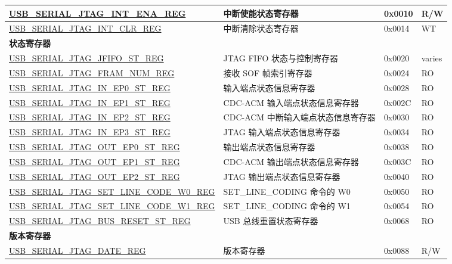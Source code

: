 \begin{longtable}{ | p{7.4cm} | p{5.2cm} | p{1.2cm} | p{1.7cm} | }
\hyperref[regdesc:USBSERIALJTAGINTENAREG]{USB\_SERIAL\_JTAG\_INT\_ENA\_REG} & 中断使能状态寄存器 & 0x0010 & R/W \\ \hline
\hyperref[regdesc:USBSERIALJTAGINTCLRREG]{USB\_SERIAL\_JTAG\_INT\_CLR\_REG} & 中断清除状态寄存器 & 0x0014 & WT \\ \hline
\multicolumn{4}{|l|}{\textbf{状态寄存器}} \\ \hline
\hyperref[regdesc:USBSERIALJTAGJFIFOSTREG]{USB\_SERIAL\_JTAG\_JFIFO\_ST\_REG} & JTAG FIFO 状态与控制寄存器 & 0x0020 & varies \\ \hline
\hyperref[regdesc:USBSERIALJTAGFRAMNUMREG]{USB\_SERIAL\_JTAG\_FRAM\_NUM\_REG} & 接收 SOF 帧索引寄存器 & 0x0024 & RO \\ \hline
\hyperref[regdesc:USBSERIALJTAGINEP0STREG]{USB\_SERIAL\_JTAG\_IN\_EP0\_ST\_REG} & 输入端点状态信息寄存器 & 0x0028 & RO \\ \hline
\hyperref[regdesc:USBSERIALJTAGINEP1STREG]{USB\_SERIAL\_JTAG\_IN\_EP1\_ST\_REG} & CDC-ACM 输入端点状态信息寄存器 & 0x002C & RO \\ \hline
\hyperref[regdesc:USBSERIALJTAGINEP2STREG]{USB\_SERIAL\_JTAG\_IN\_EP2\_ST\_REG} & CDC-ACM 中断输入端点状态信息寄存器 & 0x0030 & RO \\ \hline
\hyperref[regdesc:USBSERIALJTAGINEP3STREG]{USB\_SERIAL\_JTAG\_IN\_EP3\_ST\_REG} & JTAG 输入端点状态信息寄存器 & 0x0034 & RO \\ \hline
\hyperref[regdesc:USBSERIALJTAGOUTEP0STREG]{USB\_SERIAL\_JTAG\_OUT\_EP0\_ST\_REG} & 输出端点状态信息寄存器 & 0x0038 & RO \\ \hline
\hyperref[regdesc:USBSERIALJTAGOUTEP1STREG]{USB\_SERIAL\_JTAG\_OUT\_EP1\_ST\_REG} & CDC-ACM 输出端点状态信息寄存器 & 0x003C & RO \\ \hline
\hyperref[regdesc:USBSERIALJTAGOUTEP2STREG]{USB\_SERIAL\_JTAG\_OUT\_EP2\_ST\_REG} & JTAG 输出端点状态信息寄存器 & 0x0040 & RO \\ \hline
\hyperref[regdesc:USBSERIALJTAGSETLINECODEW0REG]{USB\_SERIAL\_JTAG\_SET\_LINE\_CODE\_W0\_REG} & SET\_LINE\_CODING 命令的 W0 & 0x0050 & RO \\ \hline
\hyperref[regdesc:USBSERIALJTAGSETLINECODEW1REG]{USB\_SERIAL\_JTAG\_SET\_LINE\_CODE\_W1\_REG} & SET\_LINE\_CODING 命令的 W1 & 0x0054 & RO \\ \hline
\hyperref[regdesc:USBSERIALJTAGBUSRESETSTREG]{USB\_SERIAL\_JTAG\_BUS\_RESET\_ST\_REG} & USB 总线重置状态寄存器 & 0x0068 & RO \\ \hline
\multicolumn{4}{|l|}{\textbf{版本寄存器}} \\ \hline
\hyperref[regdesc:USBSERIALJTAGDATEREG]{USB\_SERIAL\_JTAG\_DATE\_REG} & 版本寄存器 & 0x0088 & R/W \\ \hline
\end{longtable}
